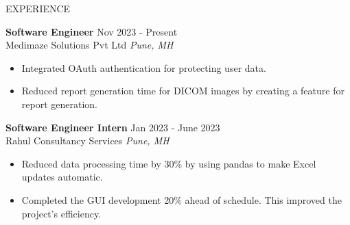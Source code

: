 \documentclass{resume} %
\begin{document}
\begin{rSection}{EXPERIENCE}

\textbf{Software Engineer} \hfill Nov 2023 - Present\\
Medimaze Solutions Pvt Ltd \hfill \textit{Pune, MH}
 \begin{itemize}
    \itemsep -3pt {} 
    \item Integrated OAuth authentication for protecting user data.
    \item Reduced report generation time for DICOM images by creating a feature for report generation. 
 \end{itemize}

 \textbf{Software Engineer Intern} \hfill Jan 2023 - June 2023\\
 Rahul Consultancy Services \hfill \textit{Pune, MH}
 \begin{itemize}
    \itemsep -3pt {} 
     \item Reduced data processing time by 30\%  by using pandas to make Excel updates automatic.
     \item Completed the GUI development 20\% ahead of schedule. This improved the project's efficiency.
 \end{itemize}
 

\end{rSection} 
\end{document}
